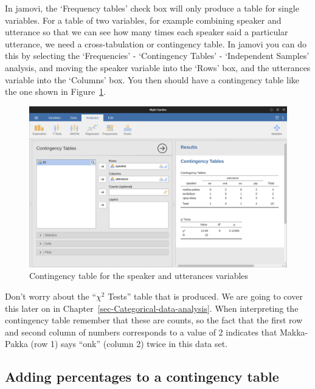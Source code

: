 \documentclass[
  a4paper,
]{book}
\begin{document}
In jamovi, the `Frequency tables' check box will only produce a table
for single variables. For a table of two variables, for example
combining speaker and utterance so that we can see how many times each
speaker said a particular utterance, we need a cross-tabulation or
contingency table. In jamovi you can do this by selecting the
`Frequencies' - `Contingency Tables' - `Independent Samples' analysis,
and moving the speaker variable into the `Rows' box, and the utterances
variable into the `Columns' box. You then should have a contingency
table like the one shown in Figure~\ref{fig-fig6-1}.

\begin{figure}

\includegraphics[width=1\textwidth,height=\textheight]{images/fig6-1.png} \hfill{}

\caption{\label{fig-fig6-1}Contingency table for the speaker and
utterances variables}

\end{figure}

Don't worry about the ``\(\chi^2\) Tests'' table that is produced. We
are going to cover this later on in
Chapter~\ref{sec-Categorical-data-analysis}. When interpreting the
contingency table remember that these are counts, so the fact that the
first row and second column of numbers corresponds to a value of 2
indicates that Makka-Pakka (row 1) says ``onk'' (column 2) twice in this
data set.

\hypertarget{adding-percentages-to-a-contingency-table}{%
\subsection{Adding percentages to a contingency
table}\label{adding-percentages-to-a-contingency-table}}
\end{document}
